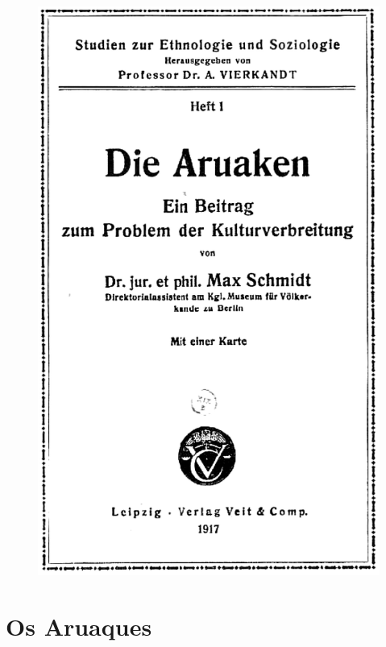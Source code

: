 \pagebreak
\thispagestyle{empty}

\begin{center}
\begin{figure}[H]
\begin{absolutelynopagebreak}
  \includegraphics[width=\textwidth]{./FRONTISPICIO.pdf}  

\end{absolutelynopagebreak}
\end{figure}
\end{center}

\part{Os Aruaques}
\pagestyle{baruch}

